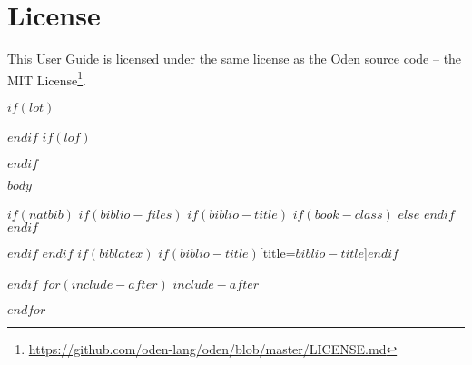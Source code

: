\documentclass[11pt,letterpaper]{book}
\renewcommand{\href}[2]{#2\footnote{\url{#1}}}
\begin{document}
\section{License}

This User Guide is licensed under the same license as the Oden source code --
the \href{https://github.com/oden-lang/oden/blob/master/LICENSE.md}{MIT License}.


$if(lot)$
\listoftables
$endif$
$if(lof)$
\listoffigures
$endif$

\mainmatter

$body$

\backmatter
$if(natbib)$
$if(biblio-files)$
$if(biblio-title)$
$if(book-class)$
\renewcommand\bibname{$biblio-title$}
$else$
\renewcommand\refname{$biblio-title$}
$endif$
$endif$


$endif$
$endif$
$if(biblatex)$
\printbibliography$if(biblio-title)$[title=$biblio-title$]$endif$

\printindex

$endif$
$for(include-after)$
$include-after$

$endfor$
\end{document}
